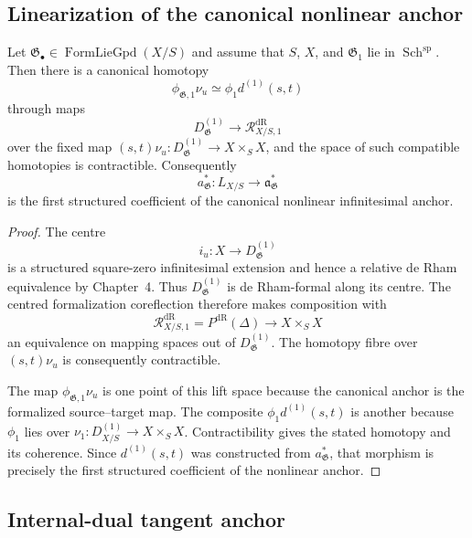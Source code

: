 \subsection{Linearization of the canonical nonlinear anchor}

\begin{theorem}
\label{thm:first-order-linearization-canonical-anchor}
Let
$\mathfrak G_\bullet\in\operatorname{FormLieGpd}(X/S)$ and assume that
$S$, $X$, and $\mathfrak G_1$ lie in
$\operatorname{Sch}^{\mathrm{sp}}$.  Then there is a canonical homotopy
\[
    \phi_{\mathfrak G,1}\nu_u
    \simeq
    \phi_1d^{(1)}(s,t)
\]
through maps
\[
    D^{(1)}_{\mathfrak G}
    \longrightarrow
    \mathcal R^{\mathrm{dR}}_{X/S,1}
\]
over the fixed map $(s,t)\nu_u:D^{(1)}_{\mathfrak G}\to X\times_SX$, and the
space of such compatible homotopies is contractible.  Consequently
\[
    a_{\mathfrak G}^{*}:
    L_{X/S}\longrightarrow\mathfrak a_{\mathfrak G}^{*}
\]
is the first structured coefficient of the canonical nonlinear infinitesimal
anchor.
\end{theorem}

\begin{proof}
The centre
\[
    i_u:X\longrightarrow D^{(1)}_{\mathfrak G}
\]
is a structured square-zero infinitesimal extension and hence a relative de
Rham equivalence by Chapter~4.  Thus $D^{(1)}_{\mathfrak G}$ is de Rham-formal along
its centre.  The centred formalization coreflection therefore makes
composition with
\[
    \mathcal R^{\mathrm{dR}}_{X/S,1}
    =P^{\mathrm{dR}}(\Delta)
    \longrightarrow X\times_SX
\]
an equivalence on mapping spaces out of $D^{(1)}_{\mathfrak G}$.  The homotopy
fibre over $(s,t)\nu_u$ is consequently contractible.

The map $\phi_{\mathfrak G,1}\nu_u$ is one point of this lift space because
the canonical anchor is the formalized source--target map.  The composite
$\phi_1d^{(1)}(s,t)$ is another because $\phi_1$ lies over
$\nu_1:D^{(1)}_{X/S}\to X\times_SX$.  Contractibility gives the stated
homotopy and its coherence.  Since $d^{(1)}(s,t)$ was constructed from
$a_{\mathfrak G}^{*}$, that morphism is precisely the first structured
coefficient of the nonlinear anchor.
\end{proof}

\subsection{Internal-dual tangent anchor}

